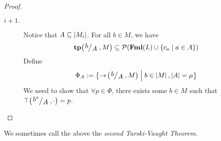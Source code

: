 \begin{proof}
\begin{description}
        \item[\underline{$i + 1.$}] Notice that $A \subseteq \left\lvert M_i \right\rvert$. For all $b \in M$, we have
        \begin{align*} %
            \tp\of{\quotient{b}{A}, M} \ssq \Powset\of{\Fml(L) \cup \setst{c_a}{a \in A}}
        \end{align*}
        Define
        \begin{align*}
            \Phi_A := \setst{\to\of{\quotient{b}{A}, M}}{b \in \abs{M}, \abs{A} = \mu}
        \end{align*}
        We need to show that $\forall p \in \Phi$, there exists some $b \in M$ such that $\top\of{\quotient{b^*}{A}, \cdot} = p$.
        \sorry
    \end{description}
\end{proof}

We sometimes call the above the \textit{second Tarski-Vaught Theorem}.

